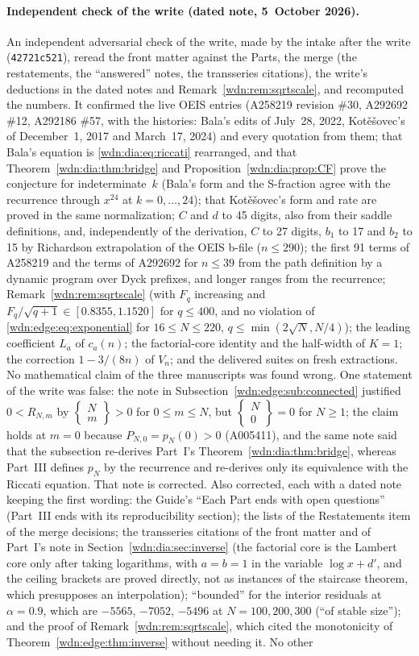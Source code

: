 \documentclass[11pt,letterpaper]{article}
\theoremstyle{remark}\newtheorem{remark}[theorem]{Remark}
\newcommand{\stir}[2]{\left\{\begin{matrix}#1\\#2\end{matrix}\right\}}
\begin{document}
\paragraph{Independent check of the write (dated note, 5~October 2026).}
An independent adversarial check of the write, made by the intake after the write (\texttt{42721c521}), reread the front matter against the Parts, the merge (the restatements, the ``answered'' notes, the transseries citations), the write's deductions in the dated notes and Remark~\ref{wdn:rem:sqrtscale}, and recomputed the numbers. It confirmed the live OEIS entries (A258219 revision \#30, A292692 \#12, A292186 \#57, with the histories: Bala's edits of July~28, 2022, Kot\v{e}\v{s}ovec's of December~1, 2017 and March~17, 2024) and every quotation from them; that Bala's equation is \eqref{wdn:dia:eq:riccati} rearranged, and that Theorem~\ref{wdn:dia:thm:bridge} and Proposition~\ref{wdn:dia:prop:CF} prove the conjecture for indeterminate~$k$ (Bala's form and the S-fraction agree with the recurrence through $x^{24}$ at $k=0,\ldots,24$); that Kot\v{e}\v{s}ovec's form and rate are proved in the same normalization; $C$ and $d$ to 45 digits, also from their saddle definitions, and, independently of the derivation, $C$ to 27 digits, $b_1$ to 17 and $b_2$ to 15 by Richardson extrapolation of the OEIS b-file ($n\le290$); the first 91 terms of A258219 and the terms of A292692 for $n\le39$ from the path definition by a dynamic program over Dyck prefixes, and longer ranges from the recurrence; Remark~\ref{wdn:rem:sqrtscale} (with $F_q$ increasing and $F_q/\sqrt{q+1}\in[0.8355,1.1520]$ for $q\le400$, and no violation of \eqref{wdn:edge:eq:exponential} for $16\le N\le220$, $q\le\min(2\sqrt N,N/4)$); the leading coefficient $L_a$ of $c_a(n)$; the factorial-core identity and the half-width of $K=1$; the correction $1-3/(8n)$ of $V_n$; and the delivered suites on fresh extractions. No mathematical claim of the three manuscripts was found wrong. One statement of the write was false: the note in Subsection~\ref{wdn:edge:sub:connected} justified $0<R_{N,m}$ by $\stir Nm>0$ for $0\le m\le N$, but $\stir N0=0$ for $N\ge1$; the claim holds at $m=0$ because $P_{N,0}=p_N(0)>0$ (A005411), and the same note said that the subsection re-derives Part~I's Theorem~\ref{wdn:dia:thm:bridge}, whereas Part~III defines $p_N$ by the recurrence and re-derives only its equivalence with the Riccati equation. That note is corrected. Also corrected, each with a dated note keeping the first wording: the Guide's ``Each Part ends with open questions'' (Part~III ends with its reproducibility section); the lists of the Restatements item of the merge decisions; the transseries citations of the front matter and of Part~I's note in Section~\ref{wdn:dia:sec:inverse} (the factorial core is the Lambert core only after taking logarithms, with $a=b=1$ in the variable $\log x+d'$, and the ceiling brackets are proved directly, not as instances of the staircase theorem, which presupposes an interpolation); ``bounded'' for the interior residuals at $\alpha=0.9$, which are $-5565$, $-7052$, $-5496$ at $N=100,200,300$ (``of stable size''); and the proof of Remark~\ref{wdn:rem:sqrtscale}, which cited the monotonicity of Theorem~\ref{wdn:edge:thm:inverse} without needing it. No other 
\end{document}
